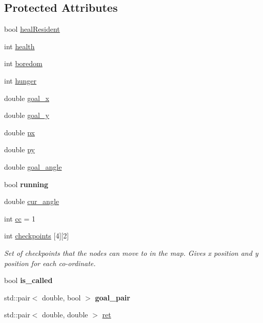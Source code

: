 \subsection*{Protected Attributes}
\begin{DoxyCompactItemize}
\item 
bool \hyperlink{classDoctor_adab6ec6a93ee2f58b436a8294120f295}{heal\-Resident}
\item 
int \hyperlink{classDoctor_ab1814310e306e7a742ffa9c5c6b913ef}{health}
\item 
int \hyperlink{classDoctor_a76dcb7e1308ef8001b7960cb542e3824}{boredom}
\item 
int \hyperlink{classDoctor_a7b59e97eb09eed2ffed797d1174ac47f}{hunger}
\item 
double \hyperlink{classDoctor_ae058c3d6dce31d71ac4e63e3fd653275}{goal\-\_\-x}
\item 
double \hyperlink{classDoctor_aba0c1163551f144834fc0d68c556fac2}{goal\-\_\-y}
\item 
double \hyperlink{classDoctor_a6ea729b1a8fc6d33176d768ef62b0a43}{px}
\item 
double \hyperlink{classDoctor_a04b4b5bddd2b99b6eb4b7b8813eeeebf}{py}
\item 
double \hyperlink{classDoctor_a27377808d49670322af2ce4ec34730f1}{goal\-\_\-angle}
\item 
\hypertarget{classDoctor_a2f7dffac0f8141914640e8f9bee5e7ff}{bool {\bfseries running}}\label{classDoctor_a2f7dffac0f8141914640e8f9bee5e7ff}

\item 
double \hyperlink{classDoctor_ab67e7a3eab1a57a0cfa52d84fe52414d}{cur\-\_\-angle}
\item 
int \hyperlink{classDoctor_a254303eb3ae4982340eb079ea76e942a}{cc} = 1
\item 
int \hyperlink{classDoctor_a9bb025d7f8f843371b1c63414272afe1}{checkpoints} \mbox{[}4\mbox{]}\mbox{[}2\mbox{]}
\begin{DoxyCompactList}\small\item\em Set of checkpoints that the nodes can move to in the map. Gives x position and y position for each co-\/ordinate. \end{DoxyCompactList}\item 
\hypertarget{classDoctor_a0566f795b41ece871b82ed7b63c5a780}{bool {\bfseries is\-\_\-called}}\label{classDoctor_a0566f795b41ece871b82ed7b63c5a780}

\item 
\hypertarget{classDoctor_a31d510c612a7f9d59efbcc8327f7adf3}{std\-::pair$<$ double, bool $>$ {\bfseries goal\-\_\-pair}}\label{classDoctor_a31d510c612a7f9d59efbcc8327f7adf3}

\item 
std\-::pair$<$ double, double $>$ \hyperlink{classDoctor_ac371e75b4dcac584c9f2fa89585fefd7}{ret}
\end{DoxyCompactItemize}
